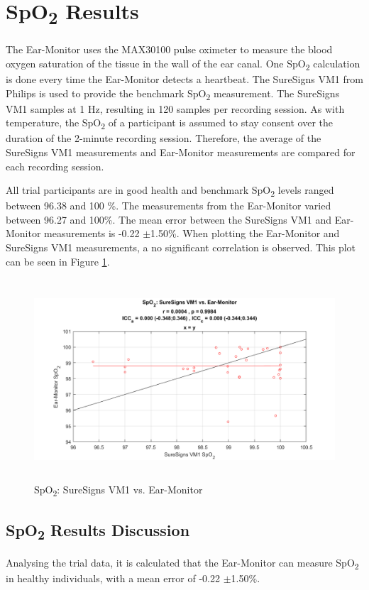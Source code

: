 \section{SpO\textsubscript{2} Results}
The Ear-Monitor uses the MAX30100 pulse oximeter to measure the blood oxygen saturation of the tissue in the wall of the ear canal. One SpO\textsubscript{2} calculation is done every time the Ear-Monitor detects a heartbeat. The SureSigns VM1 from Philips is used to provide the benchmark SpO\textsubscript{2} measurement. The SureSigns VM1 samples at 1 Hz, resulting in 120 samples per recording session. As with temperature, the SpO\textsubscript{2} of a participant is assumed to stay consent over the duration of the 2-minute recording session. Therefore, the average of the SureSigns VM1 measurements and Ear-Monitor measurements are compared for each recording session.

\medskip

All trial participants are in good health and benchmark SpO\textsubscript{2} levels ranged between 96.38 and 100 \%. The measurements from the Ear-Monitor varied between 96.27 and 100\%. The mean error between the SureSigns VM1 and Ear-Monitor measurements is -0.22 $\pm$1.50\%. When plotting the Ear-Monitor and SureSigns VM1 measurements, a no significant correlation is observed. This plot can be seen in Figure \ref{fig:SpO2Scatter}.

\begin{figure}[H]
   \centering
   \includegraphics[width=12cm,height=7.5cm]{figs/SpO2Scatter.png}
   \caption{SpO\textsubscript{2}: SureSigns VM1 vs. Ear-Monitor}
   \label{fig:SpO2Scatter}
\end{figure}

\subsection{SpO\textsubscript{2} Results Discussion}
Analysing the trial data, it is calculated that the Ear-Monitor can measure SpO\textsubscript{2} in healthy individuals, with a mean error of -0.22 $\pm$1.50\%.

